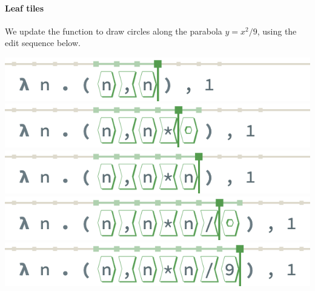 
\paragraph{Leaf tiles}
We update the function to
draw circles along the parabola $y = x^2/9$,
using the edit sequence below.

\begin{center}
  \centering
  \includegraphics[width=0.6\columnwidth]{img/linear-insertion-0.png}
  \includegraphics[width=0.6\columnwidth]{img/linear-insertion-1.png}
  \includegraphics[width=0.6\columnwidth]{img/linear-insertion-2.png}
  \includegraphics[width=0.6\columnwidth]{img/linear-insertion-3.png}
  \includegraphics[width=0.6\columnwidth]{img/linear-insertion-4.png}
\end{center}


